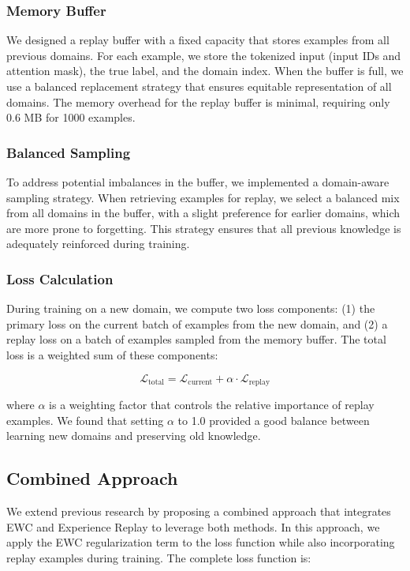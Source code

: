 \documentclass[conference]{IEEEtran}
\begin{document}
\subsubsection{Memory Buffer}
We designed a replay buffer with a fixed capacity that stores examples from all previous domains. For each example, we store the tokenized input (input IDs and attention mask), the true label, and the domain index. When the buffer is full, we use a balanced replacement strategy that ensures equitable representation of all domains. The memory overhead for the replay buffer is minimal, requiring only 0.6 MB for 1000 examples.

\subsubsection{Balanced Sampling}
To address potential imbalances in the buffer, we implemented a domain-aware sampling strategy. When retrieving examples for replay, we select a balanced mix from all domains in the buffer, with a slight preference for earlier domains, which are more prone to forgetting. This strategy ensures that all previous knowledge is adequately reinforced during training.

\subsubsection{Loss Calculation}
During training on a new domain, we compute two loss components: (1) the primary loss on the current batch of examples from the new domain, and (2) a replay loss on a batch of examples sampled from the memory buffer. The total loss is a weighted sum of these components:

\begin{equation}
\mathcal{L}_{\text{total}} = \mathcal{L}_{\text{current}} + \alpha \cdot \mathcal{L}_{\text{replay}}
\end{equation}

where $\alpha$ is a weighting factor that controls the relative importance of replay examples. We found that setting $\alpha$ to 1.0 provided a good balance between learning new domains and preserving old knowledge.

\subsection{Combined Approach}
We extend previous research by proposing a combined approach that integrates EWC and Experience Replay to leverage both methods. In this approach, we apply the EWC regularization term to the loss function while also incorporating replay examples during training. The complete loss function is:
\end{document}
